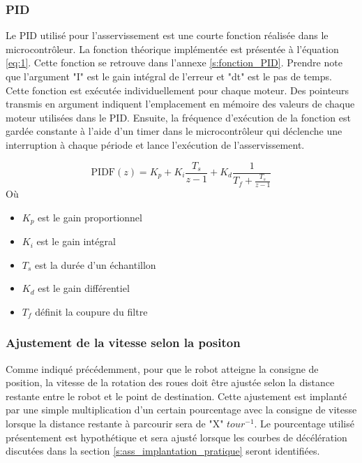 \subsubsection{PID}
Le PID utilisé pour l'asservissement est une courte fonction réalisée dans le microcontrôleur. La fonction théorique implémentée est présentée à l'équation \ref{eq:1}. Cette fonction se retrouve dans l'annexe \ref{s:fonction_PID}. Prendre note que l'argument "I" est le gain intégral de l'erreur et "dt" est le pas de temps. Cette fonction est exécutée individuellement pour chaque moteur. Des pointeurs transmis en argument indiquent l'emplacement en mémoire des valeurs de chaque moteur utilisées dans le PID. Ensuite, la fréquence d'exécution de la fonction est gardée constante à l'aide d'un timer dans le microcontrôleur qui déclenche une interruption à chaque période et lance l'exécution de l'asservissement.

\begin{equation}
\label{eq:1}
\mbox{PIDF}(z) = K_p + K_i \frac{T_s}{z-1} + K_d \frac{1}{T_f + \frac{T_s}{z -1}}
\end{equation}
Où
\begin{itemize}
\item $K_p$ est le gain proportionnel
\item $K_i$ est le gain intégral
\item $T_s$ est la durée d'un échantillon
\item $K_d$ est le gain différentiel
\item $T_f$ définit la coupure du filtre
\end{itemize}
\subsubsection{Ajustement de la vitesse selon la positon}
Comme indiqué précédemment, pour que le robot atteigne la consigne de position, la vitesse de la rotation des roues doit être ajustée selon la distance restante entre le robot et le point de destination. Cette ajustement est implanté par une simple multiplication d'un certain pourcentage avec la consigne de vitesse lorsque la distance restante à parcourir sera de "X" $tour^{-1}$. Le pourcentage utilisé présentement est hypothétique et sera ajusté lorsque les courbes de décélération discutées dans la section \ref{s:ass_implantation_pratique} seront identifiées.

